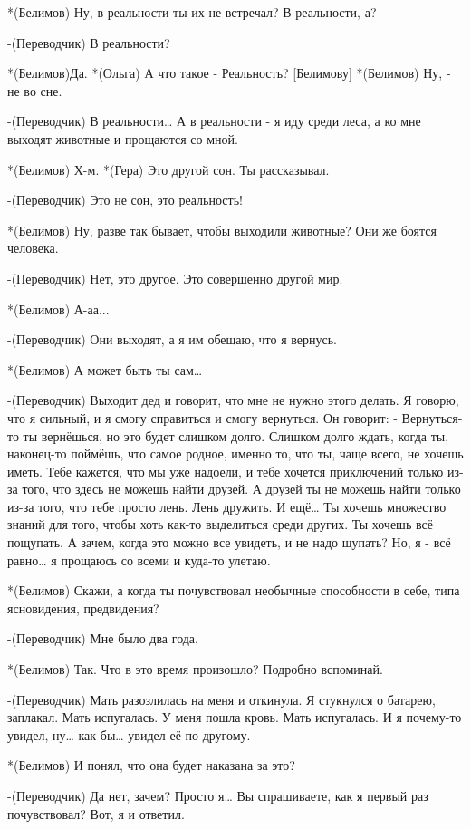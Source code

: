 *(Белимов) Ну, в реальности ты их не встречал? В реальности, а?

-(Переводчик) В реальности?

*(Белимов)Да.
*(Ольга) А что такое - Реальность? [Белимову]
*(Белимов) Ну, - не во сне.

-(Переводчик) В реальности… А в реальности - я иду среди леса, а ко мне выходят животные и прощаются со мной.

*(Белимов) Х-м.
*(Гера) Это другой сон. Ты рассказывал.

-(Переводчик) Это не сон, это реальность!

*(Белимов) Ну, разве так бывает, чтобы выходили животные? Они же боятся человека.

-(Переводчик) Нет, это другое. Это совершенно другой мир.

*(Белимов) А-аа...

-(Переводчик) Они выходят, а я им обещаю, что я вернусь. 

*(Белимов) А может быть ты сам…

-(Переводчик) Выходит дед и говорит, что мне не нужно этого делать. Я говорю, что я сильный, и я смогу справиться и смогу вернуться. Он говорит: -  Вернуться-то ты вернёшься, но это будет слишком долго. Слишком долго ждать, когда ты, наконец-то поймёшь, что самое родное, именно то, что ты, чаще всего, не хочешь иметь. Тебе кажется, что мы уже надоели, и тебе хочется приключений только из-за того, что здесь не можешь найти друзей. А друзей ты не можешь найти только из-за того, что тебе просто лень. Лень дружить. И ещё… Ты хочешь множество знаний для того, чтобы хоть как-то выделиться среди других. Ты хочешь всё пощупать. А зачем, когда это можно все увидеть, и не надо щупать? Но, я - всё равно… я прощаюсь со всеми и куда-то улетаю.

*(Белимов) Скажи, а когда ты почувствовал необычные способности в себе, типа ясновидения, предвидения?


-(Переводчик) Мне было два года.

*(Белимов) Так. Что в это время произошло? Подробно вспоминай.

-(Переводчик) Мать разозлилась на меня и откинула. Я стукнулся о  батарею, заплакал. Мать испугалась. У меня пошла кровь. Мать испугалась. И я почему-то увидел, ну… как бы… увидел её по-другому.

*(Белимов) И понял, что она будет наказана за это?

-(Переводчик) Да нет, зачем? Просто я… Вы спрашиваете, как я первый раз почувствовал? Вот, я и ответил.


